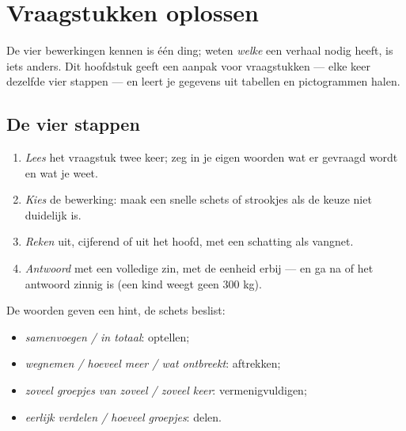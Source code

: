 \chapter{Vraagstukken oplossen}\label{ch:g3:problems}

De vier bewerkingen kennen is één ding; weten \emph{welke} een verhaal
nodig heeft, is iets anders. Dit hoofdstuk geeft een aanpak voor
vraagstukken --- elke keer dezelfde vier stappen --- en leert je gegevens
uit tabellen en pictogrammen halen.

\section{De vier stappen}

\begin{method}\label{met:g3:problems:steps}
\begin{enumerate}
  \item \emph{Lees} het vraagstuk twee keer; zeg in je eigen woorden wat
        er gevraagd wordt en wat je weet.
  \item \emph{Kies} de bewerking: maak een snelle schets of strookjes als
        de keuze niet duidelijk is.
  \item \emph{Reken} uit, cijferend of uit het hoofd, met een schatting
        als vangnet.
  \item \emph{Antwoord} met een volledige zin, met de eenheid erbij ---
        en ga na of het antwoord zinnig is (een kind weegt geen $300$
        kg).
\end{enumerate}
\end{method}

\begin{example}\label{ex:g3:problems:which}
De woorden geven een hint, de schets beslist:
\begin{itemize}
  \item \emph{samenvoegen / in totaal}: optellen;
  \item \emph{wegnemen / hoeveel meer / wat ontbreekt}: aftrekken;
  \item \emph{zoveel groepjes van zoveel / zoveel keer}:
        vermenigvuldigen;
  \item \emph{eerlijk verdelen / hoeveel groepjes}: delen.
\end{itemize}
\end{example}

